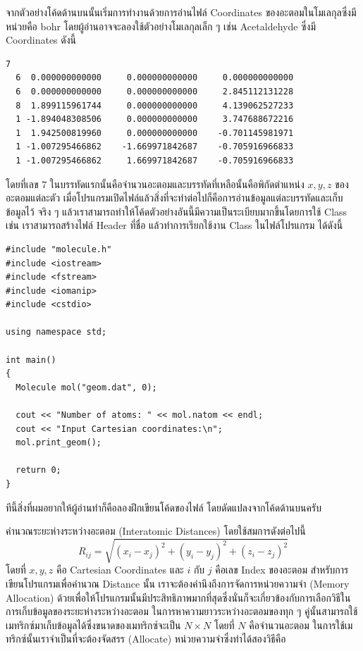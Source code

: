 \vspace{5pt}

จากตัวอย่างโค้ดด้านบนนั้นเริ่มการทำงานด้วยการอ่านไฟล์ Coordinates ของอะตอมในโมเลกุลซึ่งมีหน่วยคือ bohr โดยผู้อ่านอาจจะลองใช้ตัวอย่างโมเลกุลเล็ก ๆ เช่น Acetaldehyde ซึ่งมี Coordinates ดังนี้
%
\begin{Verbatim}[frame=single]
  7
  6  0.000000000000     0.000000000000     0.000000000000
  6  0.000000000000     0.000000000000     2.845112131228
  8  1.899115961744     0.000000000000     4.139062527233
  1 -1.894048308506     0.000000000000     3.747688672216
  1  1.942500819960     0.000000000000    -0.701145981971
  1 -1.007295466862    -1.669971842687    -0.705916966833
  1 -1.007295466862     1.669971842687    -0.705916966833
\end{Verbatim}
%
โดยที่เลข 7 ในบรรทัดแรกนั้นคือจำนวนอะตอมและบรรทัดที่เหลือนั้นคือพิกัดตำแหน่ง $x, y, z$ ของอะตอมแต่ละตัว เมื่อโปรแกรมเปิดไฟล์แล้วสิ่งที่จะทำต่อไปก็คือการอ่านข้อมูลแต่ละบรรทัดและเก็บข้อมูลไว้ จริง ๆ แล้วเราสามารถทำให้โค้ดตัวอย่างอันนี้มีความเป็นระเบียบมากขึ้นโดยการใช้ Class เช่น เราสามารถสร้างไฟล์ Header ที่ชื่อ  แล้วทำการเรียกใช้งาน Class ในไฟล์โปรแกรม  ได้ดังนี้

\vspace{5pt}

\begin{lstlisting}[style=MyC++]
#include "molecule.h"
#include <iostream>
#include <fstream>
#include <iomanip>
#include <cstdio>

using namespace std;

int main()
{
  Molecule mol("geom.dat", 0);

  cout << "Number of atoms: " << mol.natom << endl;
  cout << "Input Cartesian coordinates:\n";
  mol.print_geom();

  return 0;
}
\end{lstlisting}
%
\vspace{5pt}
%
ทีนี้สิ่งที่ผมอยากให้ผู้อ่านทำก็คือลองฝึกเขียนโค้ดของไฟล์  โดยดัดแปลงจากโค้ดด้านบนครับ

\noindent {}

คำนวณระยะห่างระหว่างอะตอม (Interatomic Distances) โดยใช้สมการดังต่อไปนี้
%
\begin{equation}
  R_{ij}
  =
  \sqrt{
    (x_{i} - x_{j})^{2}
    + (y_{i} - y_{j})^{2}
    + (z_{i} - z_{j})^{2}
  }
\end{equation}
%
โดยที่ $x, y, z$ คือ Cartesian Coordinates และ $i$ กับ $j$ คือเลข Index ของอะตอม
%
สำหรับการเขียนโปรแกรมเพื่อคำนวณ Distance นั้น เราจะต้องคำนึงถึงการจัดการหน่วยความจำ (Memory Allocation) ด้วยเพื่อให้โปรแกรมนั้นมีประสิทธิภาพมากที่สุดซึ่งนั่นก็จะเกี่ยวข้องกับการเลือกวิธีในการเก็บข้อมูลของระยะห่างระหว่างอะตอม ในการหาความยาวระหว่างอะตอมของทุก ๆ คู่นั้นสามารถใช้เมทริกซ์มาเก็บข้อมูลได้ซึ่งขนาดของเมทริกซ์จะเป็น $N \times N$ โดยที่ $N$ คือจำนวนอะตอม ในการใช้เมทริกซ์นั้นเราจำเป็นที่จะต้องจัดสรร (Allocate) หน่วยความจำซึ่งทำได้สองวิธีคือ

